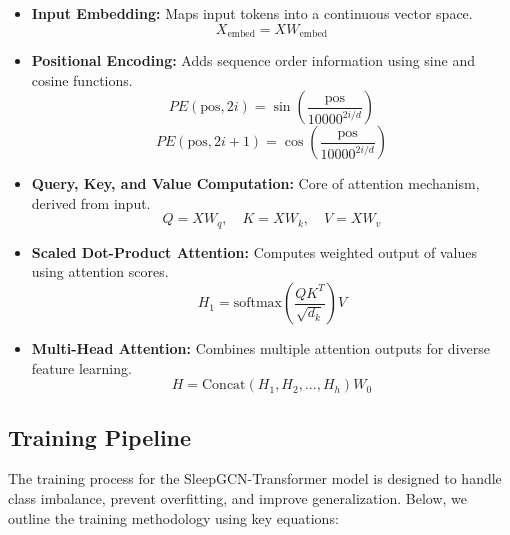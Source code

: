 \begin{itemize}
	\item \textbf{Input Embedding:} Maps input tokens into a continuous vector space.
	\begin{equation}
		X_{\text{embed}} = X W_{\text{embed}}
	\end{equation}
	
	\item \textbf{Positional Encoding:} Adds sequence order information using sine and cosine functions.
	\begin{equation}
		PE(\text{pos}, 2i) = \sin\left(\frac{\text{pos}}{10000^{2i/d}}\right)
	\end{equation}
	\begin{equation}
		PE(\text{pos}, 2i+1) = \cos\left(\frac{\text{pos}}{10000^{2i/d}}\right)
	\end{equation}
	
	\item \textbf{Query, Key, and Value Computation:} Core of attention mechanism, derived from input.
	\begin{equation}
		Q = XW_q,\quad K = XW_k,\quad V = XW_v
	\end{equation}
	
	\item \textbf{Scaled Dot-Product Attention:} Computes weighted output of values using attention scores.
	\begin{equation}
		H_1 = \text{softmax}\left(\frac{QK^T}{\sqrt{d_k}}\right) V
	\end{equation}
	
	\item \textbf{Multi-Head Attention:} Combines multiple attention outputs for diverse feature learning.
	\begin{equation}
		H = \text{Concat}(H_1, H_2, ..., H_h) W_0
	\end{equation}
\end{itemize}














\subsection{Training Pipeline}

The training process for the SleepGCN-Transformer model is designed to handle class imbalance, prevent overfitting, and improve generalization. Below, we outline the training methodology using key equations:

